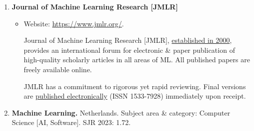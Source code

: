 \documentclass{article}
\begin{document}
\begin{enumerate}
	\item {\bf Journal of Machine Learning Research [JMLR]}
	
	\begin{itemize}
		\item Website: \url{https://www.jmlr.org/}.
		
		Journal of Machine Learning Research [JMLR], \href{https://www.jmlr.org/history.html}{established in 2000}, provides an international forum for electronic \& paper publication of high-quality scholarly articles in all areas of ML. All published papers are freely available online.
		
		JMLR has a commitment to rigorous yet rapid reviewing. Final versions are \href{https://www.jmlr.org/papers}{published electronically} (ISSN 1533-7928) immediately upon receipt.
	\end{itemize}
	\item {\bf Machine Learning.} Netherlands. Subject area \& category: Computer Science [AI, Software]. SJR 2023: 1.72.
	

\end{enumerate}
\end{document}
